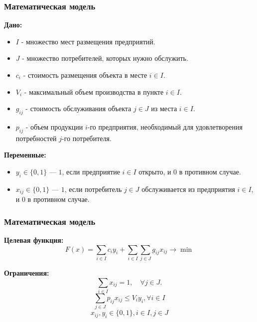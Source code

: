 \documentclass[12pt]{beamer}
\begin{document}
    \begin{frame}
        \frametitle{Математическая модель}
    
        \textbf{Дано:}
        \begin{itemize}
            \item $I$ - множество мест размещения предприятий.
            \item $J$ - множество потребителей, которых нужно обслужить.
            \item $c_i$ - стоимость размещения объекта в месте $i \in I$.
            \item $V_{i}$ - максимальный объем производства в пункте $i \in I$.
            \item $g_{ij}$ - стоимость обслуживания объекта $j \in J$ из места $i \in I$.
            \item $p_{ij}$ - объем продукции $i$-го предприятия, необходимый для удовлетворения потребностей $j$-го потребителя.
        \end{itemize}

        \textbf{Переменные:}
        \begin{itemize}
            \item $y_i \in \{0, 1\}$ — $1$, если предприятие $i \in I$ открыто, и $0$ в противном случае.
            \item $x_{ij} \in \{0, 1\}$ — $1$, если потребитель $j \in J$ обслуживается из предприятия $i \in I$, и $0$ в противном случае.
        \end{itemize}
    
    \end{frame}

    \begin{frame}
        \frametitle{Математическая модель}
    
        \textbf{Целевая функция:}
        \begin{equation}
            F(x) = \sum_{i \in I} c_i y_i + \sum_{i \in I} \sum_{j \in J} g_{ij} x_{ij} \to \min
        \end{equation}

        \textbf{Ограничения:}
        \begin{equation}
            \sum_{i \in I} x_{ij} = 1, \quad \forall j \in J.
        \end{equation}
        \begin{equation}
            \sum_{j \in J} p_{ij} x_{ij} \leq V_{i} y_{i}, \forall i \in I
        \end{equation}
        \begin{equation}
            x_{ij}, y_i \in \{0, 1\}, i \in I, j \in J
        \end{equation}
    
    \end{frame}
\end{document}
